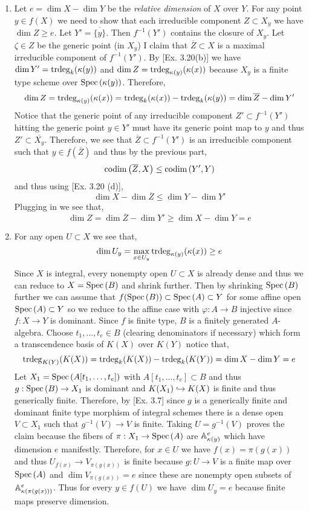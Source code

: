 \documentclass[12pt]{article}
\begin{document}
\begin{enumerate}
\item Let $e = \dim{X} - \dim{Y}$ be the \textit{relative dimension} of $X$ over $Y$. For any point $y \in f(X)$ we need to show that each irreducible component $Z \subset X_y$ we have $\dim{Z} \ge e$. Let $Y' = \overline{ \{ y \} }$. Then $f^{-1}(Y')$ contains the closure of $X_y$. Let $\zeta \in Z$ be the generic point (in $X_y$) I claim that $\overline{Z} \subset X$ is a maximal irreducible component of $f^{-1}(Y')$. 
By [Ex. 3.20(b)] we have $\dim{Y'} = \mathrm{trdeg}_{k}(\kappa(y))$ and $\dim{Z} = \mathrm{trdeg}_{\kappa(y)}(\kappa(x))$ because $X_y$ is a finite type scheme over $\mathrm{Spec}\left( \kappa(y) \right)$. Therefore,
\[ \dim{Z} = \mathrm{trdeg}_{\kappa(y)}(\kappa(x)) = \mathrm{trdeg}_{k}(\kappa(x)) - \mathrm{trdeg}_{k}(\kappa(y)) = \dim{\overline{Z}} - \dim{Y'} \]
Notice that the generic point of any irreducible component $Z' \subset f^{-1}(Y')$ hitting the generic point $y \in Y'$ must have its generic point map to $y$ and thus $Z' \subset \overline{X_y}$. Therefore, we see that $\overline{Z} \subset f^{-1}(Y')$ is an irreducible component such that $y \in f(\overline{Z})$ and thus by the previous part,
\[ \mathrm{codim}\left( \overline{Z}, X \right) \le \mathrm{codim}\left( Y', Y \right) \]
and thus using [Ex. 3.20 (d)],
\[ \dim{X} - \dim{\overline{Z}} \le \dim{Y} - \dim{Y'} \]
Plugging in we see that,
\[ \dim{Z} = \dim{\overline{Z}} - \dim{Y'} \ge \dim{X} - \dim{Y} = e \]

\item For any open $U \subset X$ we see that,
\[ \dim{U_y} = \max_{x \in U_y} \mathrm{trdeg}_{\kappa(y)}(\kappa(x)) \ge e \]
Since $X$ is integral, every nonempty open $U \subset X$ is already dense and thus we can reduce to $X = \mathrm{Spec}\left( B \right)$ and shrink further. Then by shrinking $\mathrm{Spec}\left( B \right)$ further we can assume that $f(\mathrm{Spec}\left( B \right)) \subset \mathrm{Spec}\left( A \right) \subset Y$ for some affine open $\mathrm{Spec}\left( A \right) \subset Y$ so we reduce to the affine case with $\varphi : A \to B$ injective since $f : X \to Y$ is dominant. Since $f$ is finite type, $B$ is a finitely generated $A$-algebra. Choose $t_1, \dots, t_e \in B$ (clearing denominators if necessary) which form a transcendence basis of $K(X)$ over $K(Y)$ notice that,
\[ \mathrm{trdeg}_{K(Y)}(K(X)) = \mathrm{trdeg}_{k}(K(X)) - \mathrm{trdeg}_{k}(K(Y)) = \dim{X} - \dim{Y} = e \]
Let $X_1 = \mathrm{Spec}\left( A[t_1, \dots, t_e] \right)$ with $A[t_1, \dots, t_e] \subset B$ and thus $g : \mathrm{Spec}\left( B \right) \to X_1$ is dominant and $K(X_1) \hookrightarrow K(X)$ is finite and thus generically finite. Therefore, by [Ex. 3.7] since $g$ is a generically finite and dominant finite type morphism of integral schemes there is a dense open $V \subset X_1$ such that $g^{-1}(V) \to V$ is finite. Taking $U = g^{-1}(V)$ proves the claim because the fibers of $\pi : X_1 \to \mathrm{Spec}\left( A \right)$ are $\mathbb{A}^e_{\kappa(y)}$ which have dimension $e$ manifestly. Therefore, for $x \in U$ we have $f(x) = \pi(g(x))$ and thus $U_{f(x)} \to V_{\pi(g(x))}$ is finite because $g : U \to V$ is a finite map over $\mathrm{Spec}\left( A \right)$ and $\dim{V_{\pi(g(x))}} = e$ since these are nonempty open subsets of $\mathbb{A}^e_{\kappa(\pi(g(x)))}$. Thus for every $y \in f(U)$ we have $\dim{U_y} = e$ because finite maps preserve dimension.


\end{enumerate}
\end{document}
